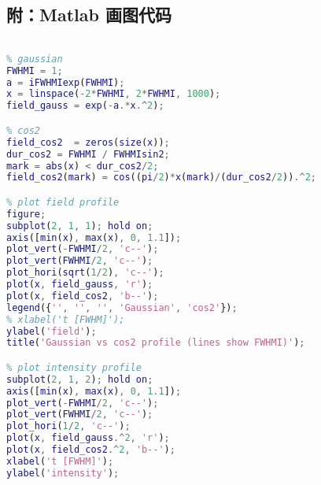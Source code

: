 \subsection{附：Matlab 画图代码}
\begin{lstlisting}[language=matlab, caption=sin2\_gaussian\_compare.m]
% plot Gaussian vs cos2 profile

% gaussian
FWHMI = 1;
a = iFWHMIexp(FWHMI);
x = linspace(-2*FWHMI, 2*FWHMI, 1000);
field_gauss = exp(-a.*x.^2);

% cos2
field_cos2  = zeros(size(x));
dur_cos2 = FWHMI / FWHMIsin2;
mark = abs(x) < dur_cos2/2;
field_cos2(mark) = cos((pi/2)*x(mark)/(dur_cos2/2)).^2;

% plot field profile
figure;
subplot(2, 1, 1); hold on;
axis([min(x), max(x), 0, 1.1]);
plot_vert(-FWHMI/2, 'c--');
plot_vert(FWHMI/2, 'c--');
plot_hori(sqrt(1/2), 'c--');
plot(x, field_gauss, 'r');
plot(x, field_cos2, 'b--');
legend({'', '', '', 'Gaussian', 'cos2'});
% xlabel('t [FWHM]');
ylabel('field');
title('Gaussian vs cos2 profile (lines show FWHMI)');

% plot intensity profile
subplot(2, 1, 2); hold on;
axis([min(x), max(x), 0, 1.1]);
plot_vert(-FWHMI/2, 'c--');
plot_vert(FWHMI/2, 'c--');
plot_hori(1/2, 'c--');
plot(x, field_gauss.^2, 'r');
plot(x, field_cos2.^2, 'b--');
xlabel('t [FWHM]');
ylabel('intensity');
\end{lstlisting}

